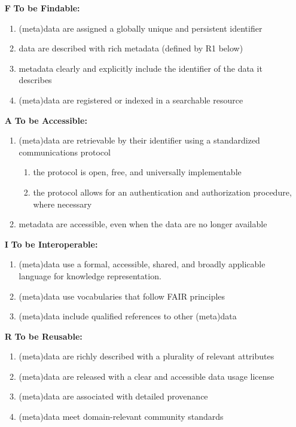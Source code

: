 \documentclass[a4paper,english,twoside,BCOR1.5cm,headsepline,DIV12,appendixprefix,final,12pt]{scrbook}
\begin{document}
\begin{enumerate}
\item[\textbf{F}] \textbf{To be Findable:}
\begin{enumerate}[1]
\item (meta)data are assigned a globally unique and persistent identifier
\item data are described with rich metadata (defined by R1 below)
\item metadata clearly and explicitly include the identifier of the data it describes
\item (meta)data are registered or indexed in a searchable resource
\end{enumerate}
\item[\textbf{A}] \textbf{To be Accessible:}
\begin{enumerate}[1]
\item (meta)data are retrievable by their identifier using a standardized communications protocol
\begin{enumerate}
\item the protocol is open, free, and universally implementable
\item the protocol allows for an authentication and authorization procedure, where necessary
\end{enumerate}
\item metadata are accessible, even when the data are no longer available
\end{enumerate}
\item[\textbf{I}] \textbf{To be Interoperable:}
\begin{enumerate}[1]
\item (meta)data use a formal, accessible, shared, and broadly applicable language for knowledge representation.
\item (meta)data use vocabularies that follow FAIR principles
\item (meta)data include qualified references to other (meta)data
\end{enumerate}
\item[\textbf{R}] \textbf{To be Reusable:}
\begin{enumerate}[1]
\item (meta)data are richly described with a plurality of relevant attributes
\item (meta)data are released with a clear and accessible data usage license
\item (meta)data are associated with detailed provenance
\item (meta)data meet domain-relevant community standards
\end{enumerate}
\end{enumerate}
\end{document}
